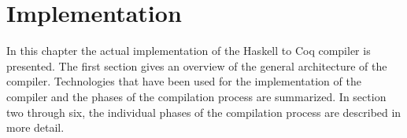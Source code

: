 \chapter{Implementation} \label{chp:implementation}
In this chapter the actual implementation of the Haskell to Coq compiler is presented.
The first section gives an overview of the general architecture of the compiler.
Technologies that have been used for the implementation of the compiler and the phases of the compilation process are summarized.
In section two through six, the individual phases of the compilation process are described in more detail.









